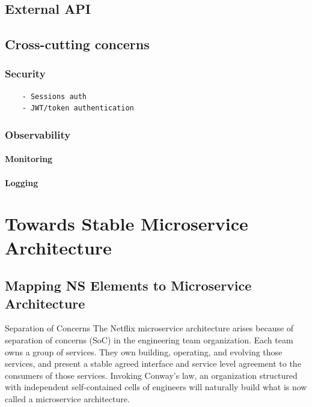 \documentclass[thesis=M,english,hidelinks]{FITthesis}[2012/10/20]
\begin{document}
% 
% 
\section{External API}
\label{sec:ext_api}


% 
%
\section{Cross-cutting concerns}
\subsection{Security}
\begin{verbatim}
    - Sessions auth
    - JWT/token authentication
\end{verbatim}


\subsection{Observability}
\subsubsection{Monitoring}
\subsubsection{Logging}


% 
% 

\chapter{Towards Stable Microservice Architecture}
\label{sec:msa_compliance}
\section{Mapping NS Elements to Microservice Architecture}


Separation of Concerns
The Netflix microservice architecture arises because of separation of concerns (SoC) in the engineering team organization. Each team owns a group of services. They own building, operating, and evolving those services, and present a stable agreed interface and service level agreement to the consumers of those services. Invoking Conway’s law, an organization structured with independent self-contained cells of engineers will naturally build what is now called a microservice architecture.
\end{document}
